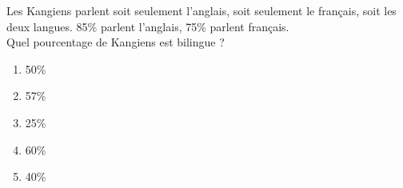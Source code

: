 Les Kangiens parlent soit seulement l'anglais, soit seulement le français, soit les deux langues. 85\% parlent l'anglais, 75\% parlent français.\\Quel pourcentage de Kangiens est bilingue ?
\begin{multicols}{5}
  \begin{enumerate}[A/]
  \item 50\%
  \item 57\%
  \item 25\%
  \item 60\%
  \item 40\%
  \end{enumerate}
\end{multicols}
